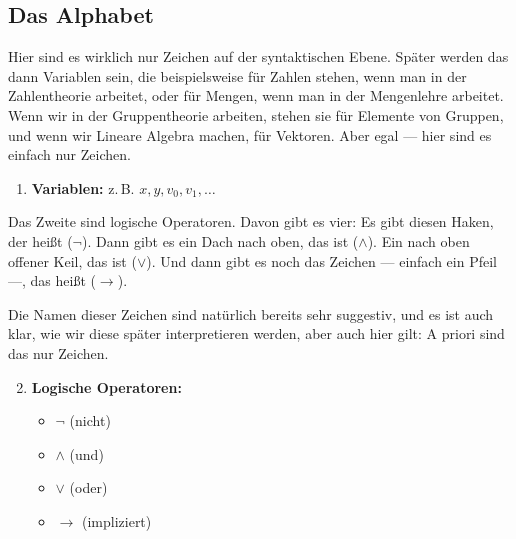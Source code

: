 \subsection{Das Alphabet}

\begin{spoken-clean}[00:31:45 - 00:32:57]
Hier sind es wirklich nur Zeichen auf der syntaktischen Ebene. Später werden das dann Variablen sein, die beispielsweise für Zahlen stehen, wenn man in der Zahlentheorie arbeitet, oder für Mengen, wenn man in der Mengenlehre arbeitet. Wenn wir in der Gruppentheorie arbeiten, stehen sie für Elemente von Gruppen, und wenn wir Lineare Algebra machen, für Vektoren. Aber egal --- hier sind es einfach nur Zeichen. 
\end{spoken-clean}

\begin{math-stroke}
\begin{enumerate}[label=\textbf{(\alph*)}]
    \item \textbf{Variablen:} z.\,B. $x, y, v_0, v_1, \dots$
\end{enumerate}
\end{math-stroke}

\begin{spoken-clean}[00:32:57 - 00:34:00]
Das Zweite sind logische Operatoren.  Davon gibt es vier: Es gibt diesen Haken, der heißt  ($\neg$). Dann gibt es ein Dach nach oben, das ist  ($\wedge$). Ein nach oben offener Keil, das ist  ($\vee$). Und dann gibt es noch das Zeichen --- einfach ein Pfeil ---, das heißt  ($\rightarrow$). 

Die Namen dieser Zeichen sind natürlich bereits sehr suggestiv, und es ist auch klar, wie wir diese später interpretieren werden, aber auch hier gilt: A priori sind das nur Zeichen.
\end{spoken-clean}

\begin{math-stroke}
\begin{enumerate}[label=\textbf{(\alph*)}]
    \setcounter{enumi}{1}
    \item \textbf{Logische Operatoren:} 
    \begin{itemize}
        \item $\neg$ (nicht)
        \item $\wedge$ (und)
        \item $\vee$ (oder)
        \item $\rightarrow$ (impliziert)
    \end{itemize}
\end{enumerate}
\end{math-stroke}

